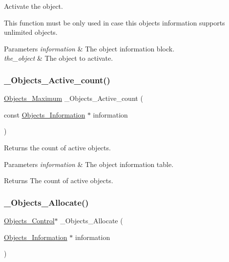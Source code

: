 Activate the object. 

This function must be only used in case this objects information supports unlimited objects.


\begin{DoxyParams}{Parameters}
{\em information} & The object information block. \\
\hline
{\em the\+\_\+object} & The object to activate. \\
\hline
\end{DoxyParams}
\mbox{\label{group__RTEMSScoreObject_ga4459fd7150f400e3217170758d0426a3}} 
\subsubsection{\texorpdfstring{\_Objects\_Active\_count()}{\_Objects\_Active\_count()}}
{\footnotesize\ttfamily \mbox{\hyperlink{group__RTEMSScoreObject_gaa2735357885ec7d7157c32f3f835f9ae}{Objects\+\_\+\+Maximum}} \+\_\+\+Objects\+\_\+\+Active\+\_\+count (\begin{DoxyParamCaption}\item[{const \mbox{\hyperlink{structObjects__Information}{Objects\+\_\+\+Information}} $\ast$}]{information }\end{DoxyParamCaption})}



Returns the count of active objects. 


\begin{DoxyParams}{Parameters}
{\em information} & The object information table.\\
\hline
\end{DoxyParams}
\begin{DoxyReturn}{Returns}
The count of active objects. 
\end{DoxyReturn}
\mbox{\label{group__RTEMSScoreObject_ga3978b5150ea104a85bb28db0585ae000}} 
\subsubsection{\texorpdfstring{\_Objects\_Allocate()}{\_Objects\_Allocate()}}
{\footnotesize\ttfamily \mbox{\hyperlink{structObjects__Control}{Objects\+\_\+\+Control}}$\ast$ \+\_\+\+Objects\+\_\+\+Allocate (\begin{DoxyParamCaption}\item[{\mbox{\hyperlink{structObjects__Information}{Objects\+\_\+\+Information}} $\ast$}]{information }\end{DoxyParamCaption})}



